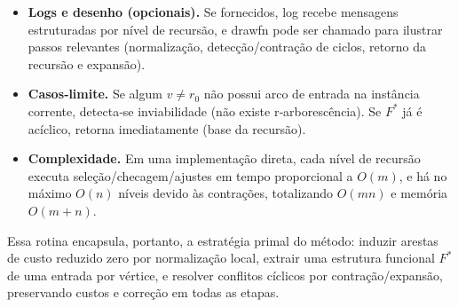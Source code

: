 \documentclass[12pt,a4paper]{article}
\def\texttt#1{#1}%
\def\_{}%
\begin{document}
\begin{itemize}
    \item \textbf{Logs e desenho (opcionais).} Se fornecidos, \texttt{log} recebe mensagens estruturadas por nível de recursão, e \texttt{draw\_fn} pode ser chamado para ilustrar passos relevantes (normalização, detecção/contração de ciclos, retorno da recursão e expansão).
    \item \textbf{Casos‑limite.} Se algum \(v\neq r_0\) não possui arco de entrada na instância corrente, detecta‑se inviabilidade (não existe r‑arborescência). Se \(F^*\) já é acíclico, retorna imediatamente (base da recursão).
    \item \textbf{Complexidade.} Em uma implementação direta, cada nível de recursão executa seleção/checagem/ajustes em tempo proporcional a \(O(m)\), e há no máximo \(O(n)\) níveis devido às contrações, totalizando \(O(mn)\) e memória \(O(m+n)\).
\end{itemize}

Essa rotina encapsula, portanto, a estratégia primal do método: induzir arestas de custo reduzido zero por normalização local, extrair uma estrutura funcional \(F^*\) de uma entrada por vértice, e resolver conflitos cíclicos por contração/expansão, preservando custos e correção em todas as etapas.
\end{document}
